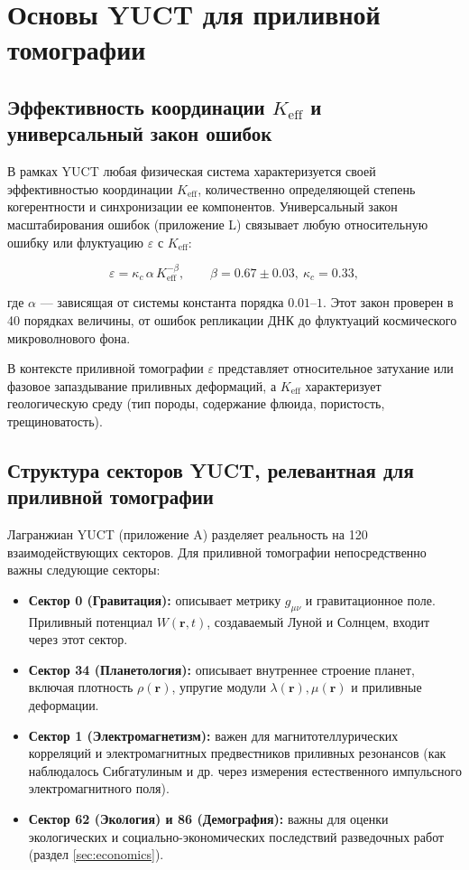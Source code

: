 \documentclass[12pt,a4paper]{article}
\theoremstyle{remark}
\newcommand{\Keff}{K_{\mathrm{eff}}}
\newcommand{\kappac}{\kappa_c}
\newcommand{\eps}{\varepsilon}
\begin{document}
	\section{Основы YUCT для приливной томографии}
	\label{sec:yuct-foundations}
	
	\subsection{Эффективность координации $\Keff$ и универсальный закон ошибок}
	
	В рамках YUCT любая физическая система характеризуется своей эффективностью координации $\Keff$, количественно определяющей степень когерентности и синхронизации ее компонентов. Универсальный закон масштабирования ошибок (приложение L) связывает любую относительную ошибку или флуктуацию $\eps$ с $\Keff$:
	
	\begin{equation}
		\eps = \kappac \, \alpha \, \Keff^{-\beta}, \qquad \beta = 0.67 \pm 0.03,\ \kappac = 0.33,
		\label{eq:universal-scaling}
	\end{equation}
	
	где $\alpha$ — зависящая от системы константа порядка $0.01$–$1$. Этот закон проверен в 40 порядках величины, от ошибок репликации ДНК до флуктуаций космического микроволнового фона.
	
	В контексте приливной томографии $\eps$ представляет относительное затухание или фазовое запаздывание приливных деформаций, а $\Keff$ характеризует геологическую среду (тип породы, содержание флюида, пористость, трещиноватость).
	
	\subsection{Структура секторов YUCT, релевантная для приливной томографии}
	
	Лагранжиан YUCT (приложение A) разделяет реальность на 120 взаимодействующих секторов. Для приливной томографии непосредственно важны следующие секторы:
	
	\begin{itemize}
		\item \textbf{Сектор 0 (Гравитация):} описывает метрику $g_{\mu\nu}$ и гравитационное поле. Приливный потенциал $W(\mathbf{r},t)$, создаваемый Луной и Солнцем, входит через этот сектор.
		\item \textbf{Сектор 34 (Планетология):} описывает внутреннее строение планет, включая плотность $\rho(\mathbf{r})$, упругие модули $\lambda(\mathbf{r}), \mu(\mathbf{r})$ и приливные деформации.
		\item \textbf{Сектор 1 (Электромагнетизм):} важен для магнитотеллурических корреляций и электромагнитных предвестников приливных резонансов (как наблюдалось Сибгатулиным и др. \cite{Sibgatulin2014} через измерения естественного импульсного электромагнитного поля).
		\item \textbf{Сектор 62 (Экология) и 86 (Демография):} важны для оценки экологических и социально-экономических последствий разведочных работ (раздел \ref{sec:economics}).
	\end{itemize}
	
\end{document}
